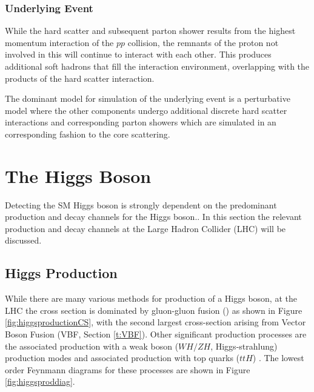 		\subsubsection{Underlying Event}
		\label{t:underlying}

			While the hard scatter and subsequent parton shower results from the highest momentum interaction of the $pp$ collision, the remnants of the proton not involved in this will continue to interact with each other. This produces additional soft hadrons that fill the interaction environment, overlapping with the products of the hard scatter interaction.

			The dominant model for simulation of the underlying event is a perturbative model where the other components undergo additional discrete hard scatter interactions and corresponding parton showers which are simulated in an corresponding fashion to the core scattering.



\section{The Higgs Boson}
\label{t:higgs}

	Detecting the SM Higgs boson is strongly dependent on the predominant production and decay channels for the Higgs boson.. In this section the relevant production and decay channels at the Large Hadron Collider (LHC) will be discussed.

	\subsection{Higgs Production}

		While there are many various methods for production of a Higgs boson, at the LHC the cross section is dominated by gluon-gluon fusion (\ggF) as shown in Figure \ref{fig:higgsproductionCS}, with the second largest cross-section arising from Vector Boson Fusion (VBF, Section \ref{t:VBF}). Other significant production processes are the associated production with a weak boson ($WH/ZH$, Higgs-strahlung) production modes and associated production with top quarks ($ttH$) \cite{LHCHiggsCS}. The lowest order Feynmann diagrams for these processes are shown in Figure \ref{fig:higgsproddiag}.

